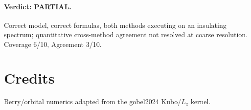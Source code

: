 \documentclass[11pt]{article}
\begin{document}
\paragraph{Verdict: PARTIAL.} Correct model, correct formulas, both methods
executing on an insulating spectrum; quantitative cross-method agreement not
resolved at coarse resolution. Coverage 6/10, Agreement 3/10.

\section*{Credits}
Berry/orbital numerics adapted from the gobel2024 Kubo/$L_z$ kernel.
\end{document}
